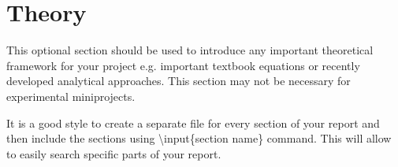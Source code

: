 \section{Theory}
This optional section should be used to introduce any important theoretical framework for your project e.g. important textbook equations or recently developed analytical approaches. This section may not be necessary for experimental miniprojects.

It is a good style to create a separate file for every section of your report and then include the sections using \textbackslash input\{section name\} command. This will allow to easily search specific parts of your report.